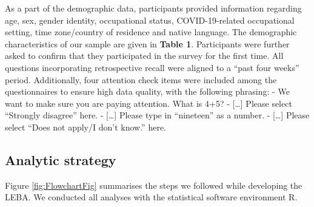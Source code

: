 \documentclass[
  man]{apa6}
\begin{document}
As a part of the demographic data, participants provided information regarding age, sex, gender identity, occupational status, COVID-19-related occupational setting, time zone/country of residence and native language. The demographic characteristics of our sample are given in \textbf{Table 1}. Participants were further asked to confirm that they participated in the survey for the first time. All questions incorporating retrospective recall were aligned to a ``past four weeks'' period. Additionally, four attention check items were included among the questionnaires to ensure high data quality, with the following phrasing:
- We want to make sure you are paying attention. What is 4+5?
- {[}\ldots{]} Please select ``Strongly disagree'' here.
- {[}\ldots{]} Please type in ``nineteen'' as a number.
- {[}\ldots{]} Please select ``Does not apply/I don't know.'' here.

\hypertarget{analytic-strategy}{%
\subsection{Analytic strategy}\label{analytic-strategy}}

Figure \ref{fig:FlowchartFig} summarises the steps we followed while developing the LEBA. We conducted all analyses with the statistical software environment R.
\end{document}
